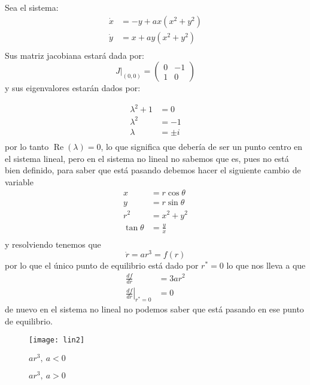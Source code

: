 \begin{ejemplo} Sea el sistema:
  $$
  \begin{aligned}
    \dot{x} &= -y+ax(x^2+y^2) \\
    \dot{y} &= x + ay(x^2+y^2) \\ 
  \end{aligned}
  $$  
  Sus matriz jacobiana estará dada por:
  $$
  \left. J \right|_{(0,0)} = \begin{pmatrix} 0 & -1 \\ 1 & 0 \end{pmatrix} 
  $$
  y sus eigenvalores estarán dados por:

  $$
  \begin{aligned}
    \lambda^2+1 &= 0 \\ 
    \lambda^2 &= -1 \\ 
    \lambda &= \pm i \\ 
  \end{aligned}
  $$
  por lo tanto $\operatorname{Re}(\lambda)=0$, lo que significa que debería de ser un punto centro en el sistema lineal, pero en el sistema no lineal no sabemos que es, pues no está bien definido, para saber que está pasando debemos hacer el siguiente cambio de variable $$
  \begin{aligned}
    x &= r\cos\theta \\ 
    y &= r\sin\theta \\ 
    r^2 &= x^2+y^2 \\ 
    \tan\theta &= \frac{y}{x} \\ 
  \end{aligned}
  $$
  y resolviendo tenemos que $$
  \dot{r}=ar^3=f(r)
  $$
  por lo que el único punto de equilibrio está dado por $r^*=0$
  lo que nos lleva a que
  $$
  \begin{aligned}
    \frac{df}{dr} &= 3ar^2 \\
    \left. \frac{df}{dr} \right|_{r^*=0} &=0
  \end{aligned}
  $$
  de nuevo en el sistema no lineal no podemos saber que está pasando en ese punto de equilibrio.

  \begin{figure}[htpb]
    \centering
    \texttt{[image: lin2]} 
    \caption{$ar^3 ,\ a<0$}
  \end{figure}

  \begin{figure}[htpb]
    \centering
    \caption{$ar^3,\ a>0$}
  \end{figure}



\end{ejemplo}
